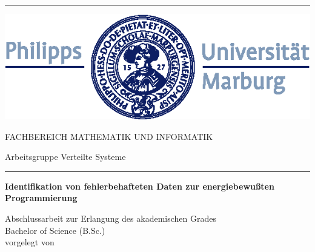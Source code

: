 \begin{titlepage}
	
\vspace{0.3cm} \noindent\rule{\textwidth}{0.5mm} \vspace{-0.3cm}	
	
\begin{minipage}{19mm} 
    \includegraphics{graphics/siegel-philipp.eps} 
\end{minipage}
	\hfill	
\begin{minipage}{65mm}	
	\sffamily
	
\begin{flushright}
	\scriptsize FACHBEREICH MATHEMATIK UND INFORMATIK

	\vspace{0.25cm}
	
	\scriptsize Arbeitsgruppe Verteilte Systeme
\end{flushright}

\end{minipage}	
 
	
	\vspace{0.3cm} \noindent\rule{\textwidth}{0.1mm}\vspace{1cm}
	\rmfamily\normalsize	



\begin{center}
\Large{\textsf{\textbf{Identifikation von fehlerbehafteten Daten zur energiebewu\ss ten Programmierung}}}
 
\vspace{1em}
 
\large{\textsf{Abschlussarbeit zur Erlangung des akademischen Grades}} \\
\Large{\textsf{Bachelor of Science (B.Sc.)}} \\
\large{\textsf{vorgelegt von}}
 

\end{center}
\end{titlepage}
